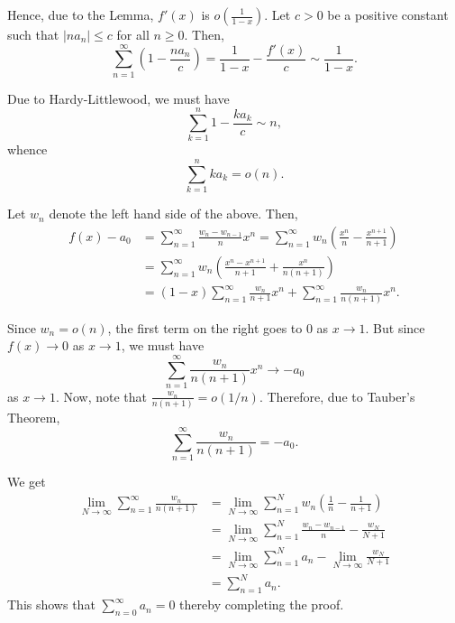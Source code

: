 \documentclass[12pt]{amsart}
\begin{document}
\begin{enumerate}[label=(\alph*)]
Hence, due to the Lemma, $f'(x)$ is $o\left(\frac{1}{1 - x}\right)$. Let $c > 0$ be a positive constant such that $|na_n|\le c$ for all $n\ge 0$. Then, 
\begin{equation*}
	\sum_{n = 1}^\infty\left(1 - \frac{na_n}{c}\right) = \frac{1}{1 - x} - \frac{f'(x)}{c}\sim\frac{1}{1 - x}.
\end{equation*}

Due to Hardy-Littlewood, we must have 
\begin{equation*}
	\sum_{k = 1}^n 1 - \frac{ka_k}{c}\sim n,
\end{equation*}
whence 
\begin{equation*}
	\sum_{k = 1}^n ka_k = o(n).
\end{equation*}

Let $w_n$ denote the left hand side of the above. Then, 
\begin{align*}
	f(x) - a_0 &= \sum_{n = 1}^\infty\frac{w_n - w_{n - 1}}{n}x^n = \sum_{n = 1}^\infty w_n\left(\frac{x^n}{n} - \frac{x^{n + 1}}{n + 1}\right)\\
	&= \sum_{n = 1}^\infty w_n\left(\frac{x^n - x^{n + 1}}{n + 1} + \frac{x^n}{n(n + 1)}\right)\\
	&= (1 - x)\sum_{n = 1}^\infty\frac{w_n}{n + 1}x^n + \sum_{n = 1}^\infty\frac{w_n}{n(n + 1)}x^n.
\end{align*}

Since $w_n = o(n)$, the first term on the right goes to $0$ as $x\to 1$. But since $f(x)\to 0$ as $x\to 1$, we must have 
\begin{equation*}
	\sum_{n = 1}^\infty\frac{w_n}{n(n + 1)}x^n\to -a_0
\end{equation*}
as $x\to 1$. Now, note that $\frac{w_n}{n(n + 1)} = o(1/n)$. Therefore, due to Tauber's Theorem, 
\begin{equation*}
	\sum_{n = 1}^\infty\frac{w_n}{n(n + 1)} = -a_0.
\end{equation*}

We get 
\begin{align*}
	\lim_{N\to\infty}\sum_{n = 1}^\infty\frac{w_n}{n(n + 1)} &= \lim_{N\to\infty}\sum_{n = 1}^N w_n\left(\frac{1}{n} - \frac{1}{n + 1}\right)\\ 
	&= \lim_{N\to\infty} \sum_{n = 1}^N\frac{w_n - w_{n - 1}}{n} - \frac{w_N}{N + 1}\\
	&= \lim_{N\to\infty}\sum_{n = 1}^N a_n - \lim_{N\to\infty}\frac{w_N}{N + 1}\\
	&= \sum_{n = 1}^N a_n.
\end{align*}
This shows that $\sum_{n = 0}^\infty a_n = 0$ thereby completing the proof.


\end{enumerate}
\end{document}
